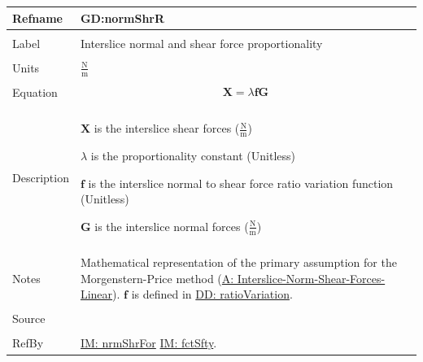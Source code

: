 \documentclass[12pt]{article}
\begin{document}
\noindent \begin{minipage}{\textwidth}
\begin{tabular}{p{} p{}}
\toprule \textbf{Refname} & \textbf{GD:normShrR}
\label{GD:normShrR}
\\ \midrule \\
Label & Interslice normal and shear force proportionality
\\ \midrule \\
Units & $\frac{\text{N}}{\text{m}}$
\\ \midrule \\
Equation & \begin{displaymath}
           \mathbf{X}=λ \mathbf{f} \mathbf{G}
           \end{displaymath}
\\ \midrule \\
Description & \begin{symbDescription}
              \item{$\mathbf{X}$ is the interslice shear forces ($\frac{\text{N}}{\text{m}}$)}
              \item{$λ$ is the proportionality constant (Unitless)}
              \item{$\mathbf{f}$ is the interslice normal to shear force ratio variation function (Unitless)}
              \item{$\mathbf{G}$ is the interslice normal forces ($\frac{\text{N}}{\text{m}}$)}
              \end{symbDescription}
\\ \midrule \\
Notes & Mathematical representation of the primary assumption for the Morgenstern-Price method (\hyperref[assumpINSFL]{A: Interslice-Norm-Shear-Forces-Linear}). $\mathbf{f}$ is defined in \hyperref[DD:ratioVariation]{DD: ratioVariation}.
\\ \midrule \\
Source & \cite{chen2005}
\\ \midrule \\
RefBy & \hyperref[IM:nrmShrFor]{IM: nrmShrFor} \hyperref[IM:fctSfty]{IM: fctSfty}.
\\ \bottomrule \end{tabular}
\end{minipage}
\par~
\end{document}
